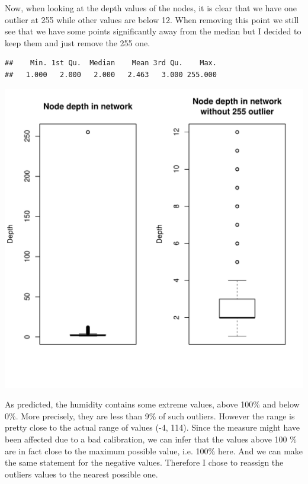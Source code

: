 \documentclass[11pt]{article}\usepackage[]{graphicx}\usepackage[]{color}
\makeatletter
\newenvironment{kframe}{%
 \def\at@end@of@kframe{}%
 \ifinner\ifhmode%
  \def\at@end@of@kframe{\end{minipage}}%
  \begin{minipage}{\columnwidth}%
 \fi\fi%
 \def\FrameCommand##1{\hskip\@totalleftmargin \hskip-\fboxsep
 \colorbox{shadecolor}{##1}\hskip-\fboxsep
     \hskip-\linewidth \hskip-\@totalleftmargin \hskip\columnwidth}%
 \MakeFramed {\advance\hsize-\width
   \@totalleftmargin\z@ \linewidth\hsize
   \@setminipage}}%
 {\par\unskip\endMakeFramed%
 \at@end@of@kframe}
\newenvironment{knitrout}{}{} %
\makeatother
\begin{document}
Now, when looking at the depth values of the nodes, it is clear that we have one outlier at 255 while other values are below 12. When removing this point we still see that we have some points significantly away from the median but I decided to keep them and just remove the 255 one.

\begin{knitrout}
\color{fgcolor}\begin{kframe}
\begin{verbatim}
##    Min. 1st Qu.  Median    Mean 3rd Qu.    Max. 
##   1.000   2.000   2.000   2.463   3.000 255.000
\end{verbatim}
\end{kframe}

{\centering \includegraphics[width=0.6\linewidth]{figure/unnamed-chunk-3-1} 

}



\end{knitrout}


As predicted, the humidity contains some extreme values, above 100\% and below 0\%. More precisely, they are less than 9\% of such outliers. However the range is pretty close to the actual range of values (-4, 114). Since the measure might have been affected due to a bad calibration, we can infer that the values above 100 \% are in fact close to the maximum possible value, i.e. 100\% here. And we can make the same statement for the negative values. Therefore I chose to reassign the outliers values to the nearest possible one.
\end{document}
